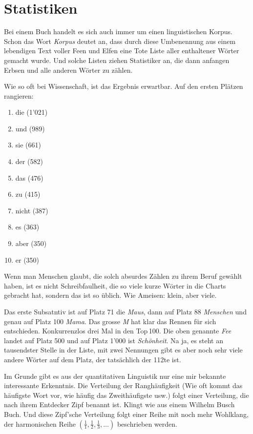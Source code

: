 \chapter*{\large\textsf{Statistiken}}
        \thispagestyle{empty}

Bei einem Buch handelt es sich auch immer um einen linguistischen Korpus. Schon
das Wort \emph{Korpus} deutet an, dass durch diese Umbenennung aus einem
lebendigen Text voller Feen und Elfen eine Tote Liste aller enthaltener Wörter
gemacht wurde. Und solche Listen ziehen Statistiker an, die dann anfangen
Erbsen und alle anderen Wörter zu zählen.

Wie so oft bei Wissenschaft, ist das Ergebnis erwartbar. Auf den ersten Plätzen
rangieren:

\begin{enumerate}
    \item die (1'021)
    \item und (989)
    \item sie (661)
    \item der (582)
    \item das (476)
    \item zu (415)
    \item nicht (387)
    \item es (363)
    \item aber (350)
    \item er (350)
\end{enumerate}

Wenn man Menschen glaubt, die solch absurdes Zählen zu ihrem Beruf gewählt
haben, ist es nicht Schreibfaulheit, die so viele kurze Wörter in die Charts
gebracht hat, sondern das ist so üblich. Wie Ameisen: klein, aber viele.

Das erste Subsatntiv ist auf Platz 71 die \emph{Maus}, dann auf Platz 88
\emph{Menschen} und genau auf Platz 100 \emph{Mama}. Das grosse \emph{M} hat
klar das Rennen für sich entschieden. Konkurrenzlos drei Mal in den Top\,100.
Die oben genannte \emph{Fee} landet auf Platz 500 und auf Platz 1'000 ist
\emph{Schönheit}. Na ja, es steht an tausendster Stelle in der Liste, mit zwei
Nennungen gibt es aber noch sehr viele andere Wörter auf dem Platz, der
tatsächlich der 112te ist.

Im Grunde gibt es aus der quantitativen Linguistik nur eine mir bekannte
interessante Erkenntnis. Die Verteilung der Ranghäufigkeit (Wie oft kommt das
häufigste Wort vor, wie häufig das Zweithäufigste usw.) folgt einer Verteilung,
die nach ihrem Entdecker Zipf benannt ist. Klingt wie aus einem Wilhelm Busch
Buch. Und diese Zipf'sche Verteilung folgt einer Reihe mit noch mehr Wohlklang,
der harmonischen Reihe
$\left(\frac{1}{1},\frac{1}{2},\frac{1}{3},\dots\right)$ beschrieben
werden. 

